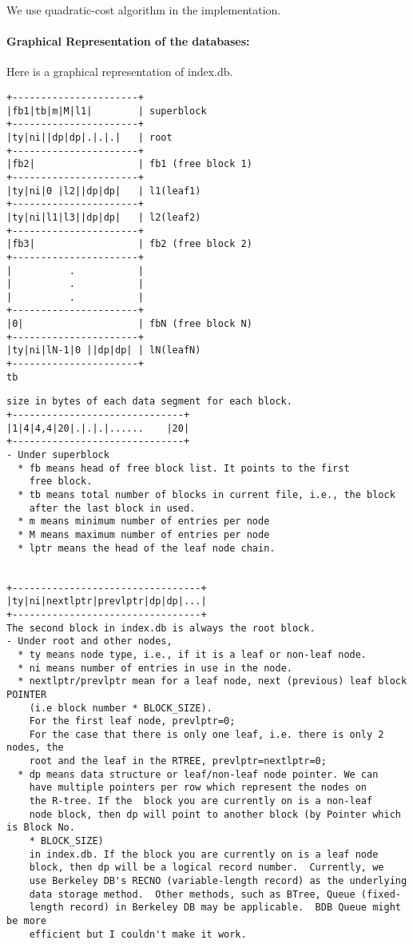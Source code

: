 \documentclass[12pt]{article}
\renewcommand{\baselinestretch}{1.2}
\begin{document}
We use quadratic-cost algorithm in the implementation.

\newpage
\paragraph{Graphical Representation of the databases:}

Here is a graphical representation of index.db.
\renewcommand{\baselinestretch}{0.8}
\begin{verbatim}
+----------------------+
|fb1|tb|m|M|l1|        | superblock
+----------------------+
|ty|ni||dp|dp|.|.|.|   | root
+----------------------+
|fb2|                  | fb1 (free block 1)
+----------------------+
|ty|ni|0 |l2||dp|dp|   | l1(leaf1)
+----------------------+
|ty|ni|l1|l3||dp|dp|   | l2(leaf2)
+----------------------+
|fb3|                  | fb2 (free block 2)
+----------------------+
|          .           |
|          .           |
|          .           |
+----------------------+
|0|                    | fbN (free block N)
+----------------------+
|ty|ni|lN-1|0 ||dp|dp| | lN(leafN)
+----------------------+
tb

\end{verbatim}
\renewcommand{\baselinestretch}{1.2}

\renewcommand{\baselinestretch}{0.8}
\begin{verbatim}
size in bytes of each data segment for each block.
+------------------------------+
|1|4|4,4|20|.|.|.|......    |20|
+------------------------------+    
- Under superblock
  * fb means head of free block list. It points to the first
    free block.
  * tb means total number of blocks in current file, i.e., the block
    after the last block in used.
  * m means minimum number of entries per node
  * M means maximum number of entries per node
  * lptr means the head of the leaf node chain.


+---------------------------------+
|ty|ni|nextlptr|prevlptr|dp|dp|...| 
+---------------------------------+
The second block in index.db is always the root block.
- Under root and other nodes,
  * ty means node type, i.e., if it is a leaf or non-leaf node.
  * ni means number of entries in use in the node.
  * nextlptr/prevlptr mean for a leaf node, next (previous) leaf block POINTER 
	(i.e block number * BLOCK_SIZE).
	For the first leaf node, prevlptr=0;
	For the case that there is only one leaf, i.e. there is only 2 nodes, the
	root and the leaf in the RTREE, prevlptr=nextlptr=0; 
  * dp means data structure or leaf/non-leaf node pointer. We can
    have multiple pointers per row which represent the nodes on
    the R-tree. If the  block you are currently on is a non-leaf
    node block, then dp will point to another block (by Pointer which is Block No.
    * BLOCK_SIZE)
    in index.db. If the block you are currently on is a leaf node
    block, then dp will be a logical record number.  Currently, we
    use Berkeley DB's RECNO (variable-length record) as the underlying 
    data storage method.  Other methods, such as BTree, Queue (fixed-
    length record) in Berkeley DB may be applicable.  BDB Queue might be more
    efficient but I couldn't make it work.

\end{verbatim}
\renewcommand{\baselinestretch}{1.2}
\end{document}
